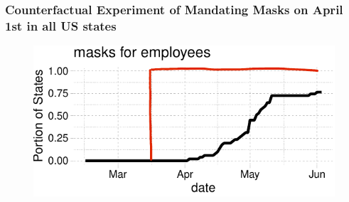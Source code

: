 \documentclass{beamer}
\begin{document}

\begin{frame}
  \frametitle{Counterfactual Experiment of Mandating Masks on April 1st in all US states}

\vspace{-0.5cm}

\begin{figure}[ht]%
      \includegraphics[width=\textwidth]{pmaskbus_p_experiment}  
\end{figure}


\end{frame}
\end{document}
